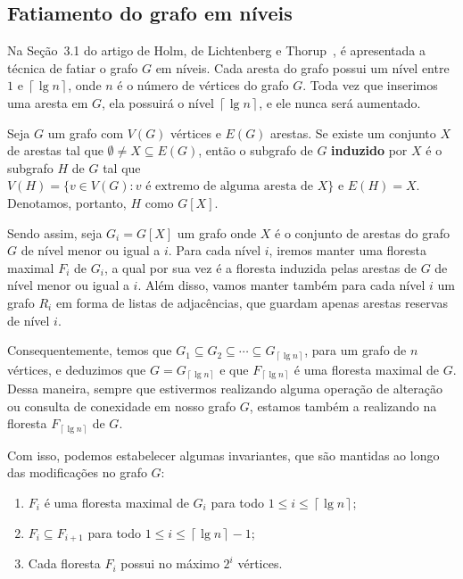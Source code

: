 \subsection{Fatiamento do grafo em níveis}
\label{sec:level-slicing}

Na Seção~3.1 do artigo de Holm, de Lichtenberg e Thorup~\cite{jacob_holm}, é apresentada a técnica de fatiar o grafo $G$ em níveis. Cada aresta do grafo possui um nível entre $1$ e $\left\lceil \lg n \right\rceil$, onde $n$ é o número de vértices do grafo $G$. Toda vez que inserimos uma aresta em $G$, ela possuirá o nível $\left\lceil \lg n \right\rceil$, e ele nunca será aumentado. 

Seja $G$ um grafo com $V(G)$ vértices e $E(G)$ arestas. Se existe um conjunto $X$ de arestas tal que $\emptyset \neq X \subseteq E(G)$, então o subgrafo de $G$ \textbf{induzido} por $X$ é o subgrafo $H$ de $G$ tal que $V(H) = \{v \in  V(G): v \text{ é extremo de alguma aresta de }X \}$ e $E(H) = X$. Denotamos, portanto, $H$ como $G[X]$.

Sendo assim, seja $G_i = G[X]$ um grafo onde $X$ é o conjunto de arestas do grafo $G$ de nível menor ou igual a $i$. Para cada nível $i$, iremos manter uma floresta maximal $F_i$ de $G_i$, a qual por sua vez é a floresta induzida pelas arestas de $G$ de nível menor ou igual a $i$. Além disso, vamos manter também para cada nível $i$ um grafo $R_i$ em forma de listas de adjacências, que guardam apenas arestas reservas de nível $i$. 

Consequentemente, temos que $G_1 \subseteq G_2 \subseteq \cdots \subseteq G_{\left\lceil \lg n \right\rceil}$, para um grafo de $n$ vértices, e deduzimos que $G = G_{\left\lceil \lg n \right\rceil}$ e que $F_{\left\lceil \lg n \right\rceil}$ é uma floresta maximal de $G$. Dessa maneira, sempre que estivermos realizando alguma operação de alteração ou consulta de conexidade em nosso grafo $G$, estamos também a realizando na floresta $F_{\left\lceil \lg n \right\rceil}$ de $G$.

Com isso, podemos estabelecer algumas invariantes, que são mantidas ao longo das modificações no grafo $G$:

\begin{enumerate}[label=(\Roman*)]
    \item \label{invariant1} $F_i$ é uma floresta maximal de $G_i$ para todo $1 \leq i \leq  \left\lceil \lg n \right\rceil$;
    
    \item \label{invariant2} $F_i \subseteq F_{i+1}$ para todo $1 \leq i \leq \left\lceil \lg n \right\rceil - 1$;
    
    \item \label{invariant3} Cada floresta $F_i$ possui no máximo $2^i$ vértices.
\end{enumerate}

